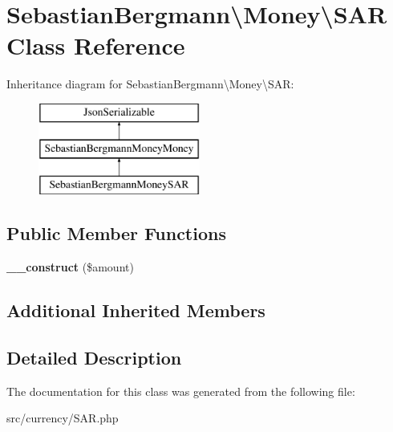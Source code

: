 \hypertarget{classSebastianBergmann_1_1Money_1_1SAR}{}\section{Sebastian\+Bergmann\textbackslash{}Money\textbackslash{}S\+A\+R Class Reference}
\label{classSebastianBergmann_1_1Money_1_1SAR}
Inheritance diagram for Sebastian\+Bergmann\textbackslash{}Money\textbackslash{}S\+A\+R\+:\begin{figure}[H]
\begin{center}
\leavevmode
\includegraphics[height=3.000000cm]{classSebastianBergmann_1_1Money_1_1SAR}
\end{center}
\end{figure}
\subsection*{Public Member Functions}
\begin{DoxyCompactItemize}
\item 
\hypertarget{classSebastianBergmann_1_1Money_1_1SAR_aab97fc2237dee508b09d7b6eb87d3996}{}{\bfseries \+\_\+\+\_\+construct} (\$amount)\label{classSebastianBergmann_1_1Money_1_1SAR_aab97fc2237dee508b09d7b6eb87d3996}

\end{DoxyCompactItemize}
\subsection*{Additional Inherited Members}


\subsection{Detailed Description}


The documentation for this class was generated from the following file\+:\begin{DoxyCompactItemize}
\item 
src/currency/S\+A\+R.\+php\end{DoxyCompactItemize}
